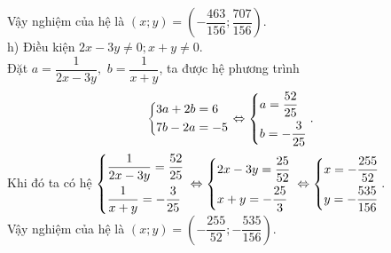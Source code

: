 \begin{ex}
{Vậy nghiệm của  hệ là $(x;y)=\left(-\dfrac{463}{156};\dfrac{707}{156}\right)$.\\ 
  h)  Điều kiện $2x-3y\ne 0; x+y\ne 0$. \\
   Đặt $a=\dfrac{1}{2x-3y},$ $b=\dfrac{1}{x+y}$, ta  được hệ phương trình
$$\left\{\begin{aligned}& 3a+2b=6\\ &  7b-2a=-5\end{aligned}\right.\Leftrightarrow \left\{\begin{aligned}&  a=\dfrac{52}{25}\\ & b=-\dfrac{3}{25}\end{aligned}\right..$$
Khi đó ta  có  hệ $\left\{\begin{aligned}& \dfrac{1}{2x-3y}=\dfrac{52}{25}\\ & \dfrac{1}{x+y}=-\dfrac{3}{25}\end{aligned}\right.$ $\Leftrightarrow \left\{\begin{aligned}& 2x-3y=\dfrac{25}{52} \\ & x+y=-\dfrac{25}{3}\end{aligned}\right.$ $\Leftrightarrow \left\{\begin{aligned}& x=-\dfrac{255}{52}\\ & y=-\dfrac{535}{156}\end{aligned}\right.$.\\
Vậy nghiệm của  hệ là $(x;y)=\left(-\dfrac{255}{52};-\dfrac{535}{156}\right)$.\\  
     
   
   }
\end{ex}


